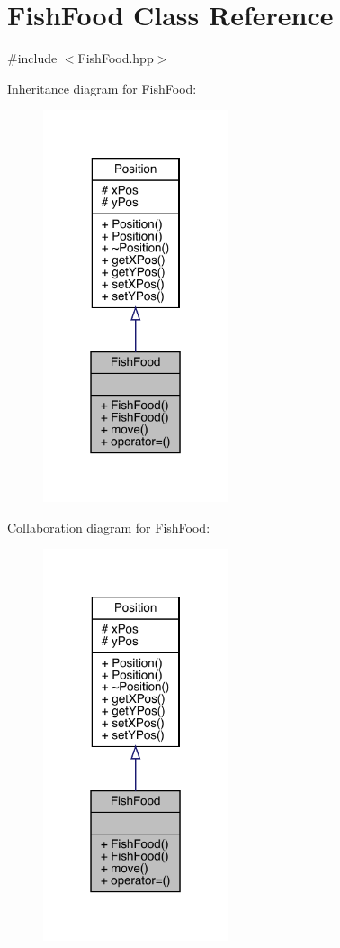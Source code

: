 \hypertarget{class_fish_food}{}\section{Fish\+Food Class Reference}
\label{class_fish_food}


{\ttfamily \#include $<$Fish\+Food.\+hpp$>$}



Inheritance diagram for Fish\+Food\+:
\nopagebreak
\begin{figure}[H]
\begin{center}
\leavevmode
\includegraphics[width=154pt]{class_fish_food__inherit__graph}
\end{center}
\end{figure}


Collaboration diagram for Fish\+Food\+:
\nopagebreak
\begin{figure}[H]
\begin{center}
\leavevmode
\includegraphics[width=154pt]{class_fish_food__coll__graph}
\end{center}
\end{figure}
